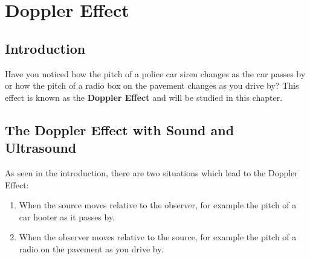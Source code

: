 \chapter{Doppler Effect}
\label{p:wsl:de12}


\section{Introduction}
Have you noticed how the pitch of a police car siren changes as the car passes by or how the pitch of a radio box on the pavement changes as you drive by? This effect is known as the \textbf{Doppler Effect} and will be studied in this chapter.\\
\section{The Doppler Effect with Sound and Ultrasound}

As seen in the introduction, there are two situations which lead to the Doppler  Effect:
\begin{enumerate}
\item{When the source moves relative to the observer, for example the pitch of a car hooter as it passes by.}
\item{When the observer moves relative to the source, for example the pitch of a radio on the pavement as you drive by.}
\end{enumerate}

